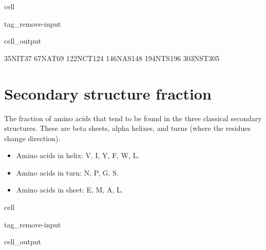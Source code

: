 \documentclass[letterpaper,10pt,english]{jupyterBook}
\begin{document}
\begin{sphinxuseclass}{cell}
\begin{sphinxuseclass}{tag_remove-input}\begin{sphinxVerbatimOutput}

\begin{sphinxuseclass}{cell_output}
\begin{sphinxVerbatim}[commandchars=\\\{\}]
35\PYGZhy{}NIT\PYGZhy{}37
67\PYGZhy{}NAT\PYGZhy{}69
122\PYGZhy{}NCT\PYGZhy{}124
146\PYGZhy{}NAS\PYGZhy{}148
194\PYGZhy{}NTS\PYGZhy{}196
303\PYGZhy{}NST\PYGZhy{}305
\end{sphinxVerbatim}

\end{sphinxuseclass}\end{sphinxVerbatimOutput}

\end{sphinxuseclass}
\end{sphinxuseclass}

\section{Secondary structure fraction}
\label{\detokenize{ipynb/chapter1:secondary-structure-fraction}}
\sphinxAtStartPar
The fraction of amino acids that tend to be found in the three classical secondary structures. These are beta sheets, alpha helixes, and turns (where the residues change direction).
\begin{itemize}
\item {} 
\sphinxAtStartPar
Amino acids in helix: V, I, Y, F, W, L.

\item {} 
\sphinxAtStartPar
Amino acids in turn: N, P, G, S.

\item {} 
\sphinxAtStartPar
Amino acids in sheet: E, M, A, L.

\end{itemize}

\begin{sphinxuseclass}{cell}
\begin{sphinxuseclass}{tag_remove-input}\begin{sphinxVerbatimOutput}

\begin{sphinxuseclass}{cell_output}
\noindent{}

\end{sphinxuseclass}\end{sphinxVerbatimOutput}

\end{sphinxuseclass}
\end{sphinxuseclass}
\end{document}
